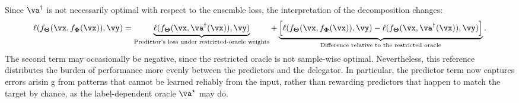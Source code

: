 \documentclass[10pt]{article} %
\def\vTheta{{\bm{\Theta}}}
\def\vPhi{{\bm{\Phi}}}
\begin{document}
Since \(\va^\dagger\) is not necessarily optimal with respect to the ensemble loss, the interpretation of the decomposition changes:
\begin{equation}
\label{eq:restricted-delegator-decomposition}
    \ell(f_{\vTheta}(\vx, f_{\vPhi}(\vx)), \vy)
    =
    \underbrace{
        \ell(f_{\vTheta}(\vx, \va^{\dagger}(\vx)), \vy)
    }_{\text{Predictor's loss under restricted-oracle weights}}
    +
    \underbrace{
        \left[
            \ell(f_{\vTheta}(\vx, f_{\vPhi}(\vx)), \vy)
            -
            \ell(f_{\vTheta}(\vx, \va^{\dagger}(\vx)), \vy)
        \right]
    }_{\text{Difference relative to the restricted oracle}}.
\end{equation}
The second term may occasionally be negative, since the restricted oracle is not sample-wise optimal. Nevertheless, this reference distributes the burden of performance more evenly between the predictors and the delegator. In particular, the predictor term now captures errors arisin g from patterns that cannot be learned reliably from the input, rather than rewarding predictors that happen to match the target by chance, as the label-dependent oracle $\va^\star$ may do.



\end{document}
